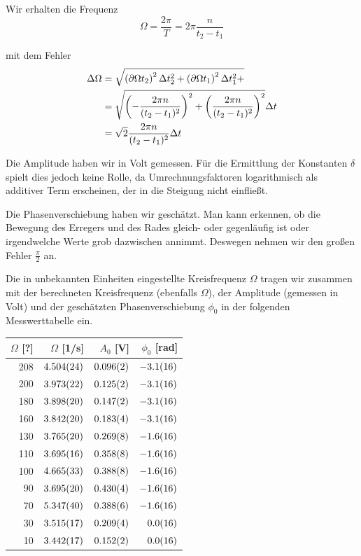 \documentclass[a4paper,german,12pt,smallheadings]{scrartcl}
\begin{document}
Wir erhalten die Frequenz
\begin{equation}
  \Omega = \frac{2 \pi}{T} = 2 \pi \frac{n}{t_2 - t_1}
\end{equation}

mit dem Fehler
\begin{align}
  \Delta \Omega &= \sqrt{
    \del{\partial{\Omega}{t_2}}^2 \Delta t_2^2 +
    \del{\partial{\Omega}{t_1}}^2 \Delta t_1^2 +
  } \\
  &= \sqrt{
    \del{-\frac{2 \pi n}{(t_2 - t_1)^2}}^2 +
    \del{\frac{2 \pi n}{(t_2 - t_1)^2}}^2
  } \Delta t \\
  &= \sqrt{2} \frac{2 \pi n}{(t_2 - t_1)^2} \Delta t
\end{align}

Die Amplitude haben wir in Volt gemessen. Für die Ermittlung der Konstanten
$\delta$ spielt dies jedoch keine Rolle, da Umrechnungsfaktoren logarithmisch
als additiver Term erscheinen, der in die Steigung nicht einfließt.

Die Phasenverschiebung haben wir geschätzt. Man kann erkennen, ob die Bewegung
des Erregers und des Rades gleich- oder gegenläufig ist oder irgendwelche Werte
grob dazwischen annimmt. Deswegen nehmen wir den großen Fehler $\frac{\pi}{2}$ an.

Die in unbekannten Einheiten eingestellte Kreisfrequenz $\Omega$ tragen wir
zusammen mit der berechneten Kreisfrequenz (ebenfalls $\Omega$), der Amplitude
(gemessen in Volt) und der geschätzten Phasenverschiebung $\phi_0$ in der
folgenden Messwerttabelle ein.

\begin{tabular}{r|r|r|r}
  $\Omega$ [?] & $\Omega$ [1/s] & $A_0$ [V] & $\phi_0$ [rad] \\
  \hline
  208 & $\num{4.504+-0.024}$ & $\num{0.096+-0.002}$ & $\num{-3.1+-1.6}$ \\
  200 & $\num{3.973+-0.022}$ & $\num{0.125+-0.002}$ & $\num{-3.1+-1.6}$ \\
  180 & $\num{3.898+-0.020}$ & $\num{0.147+-0.002}$ & $\num{-3.1+-1.6}$ \\
  160 & $\num{3.842+-0.020}$ & $\num{0.183+-0.004}$ & $\num{-3.1+-1.6}$ \\
  130 & $\num{3.765+-0.020}$ & $\num{0.269+-0.008}$ & $\num{-1.6+-1.6}$ \\
  110 & $\num{3.695+-0.016}$ & $\num{0.358+-0.008}$ & $\num{-1.6+-1.6}$ \\
  100 & $\num{4.665+-0.033}$ & $\num{0.388+-0.008}$ & $\num{-1.6+-1.6}$ \\
  90  & $\num{3.695+-0.020}$ & $\num{0.430+-0.004}$ & $\num{-1.6+-1.6}$ \\
  70  & $\num{5.347+-0.040}$ & $\num{0.388+-0.006}$ & $\num{-1.6+-1.6}$ \\
  30  & $\num{3.515+-0.017}$ & $\num{0.209+-0.004}$ & $\num{ 0.0+-1.6}$ \\
  10  & $\num{3.442+-0.017}$ & $\num{0.152+-0.002}$ & $\num{ 0.0+-1.6}$ \\
\end{tabular}
\end{document}
